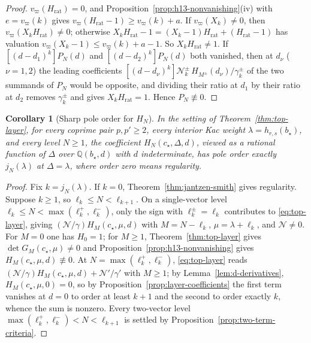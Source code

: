 \documentclass[twoside,10pt]{article}
\numberwithin{equation}{section}
\theoremstyle{slbody}
\newtheorem{corollary}[theorem]{Corollary}
\theoremstyle{definition}
\theoremstyle{remark}
\begin{document}
\begin{proof}
\(v_\varpi(H_{\mathrm{rat}})=0\), and
Proposition~\ref{prop:h13-nonvanishing}(iv) with \(e=v_\varpi(k)\) gives
\(v_\varpi(H_{\mathrm{rat}}-1)\geq v_\varpi(k)+a\).  If \(v_\varpi(X_k)\neq0\), then
\(v_\varpi(X_kH_{\mathrm{rat}})\neq0\); otherwise
\(X_kH_{\mathrm{rat}}-1=(X_k-1)H_{\mathrm{rat}}+(H_{\mathrm{rat}}-1)\) has
valuation \(v_\varpi(X_k-1)\leq v_\varpi(k)+a-1\).  So \(X_kH_{\mathrm{rat}}\neq1\).
If \([(d-d_1)^k]P_N(d)\) and \([(d-d_2)^k]P_N(d)\) both vanished, then at
\(d_\nu\) (\(\nu=1,2\)) the leading coefficients
\([(d-d_\nu)^k]\mathcal N^\pm_k\,H_{M^\pm}(d_\nu)/\gamma^\pm_k\) of the two
summands of \(P_N\) would be opposite, and dividing their ratio at \(d_1\) by
their ratio at \(d_2\) removes \(\gamma^\pm_k\) and gives
\(X_kH_{\mathrm{rat}}=1\).  Hence \(P_N\not\equiv0\).
\end{proof}

\begin{corollary}[Sharp pole order for \(H_N\)]
\label{cor:top-layer-sharp}
In the setting of Theorem~\ref{thm:top-layer}, for every coprime pair
\(p,p'\geq2\), every interior Kac weight \(\lambda=h_{r,s}(b_\star)\), and
every level \(N\geq1\), the coefficient \(H_N(c_\star,\Delta,d)\), viewed as
a rational function of \(\Delta\) over \(\mathbb Q(b_\star,d)\) with \(d\)
indeterminate, has pole order exactly \(j_N(\lambda)\) at \(\Delta=\lambda\),
where order zero means regularity.
\end{corollary}

\begin{proof}
Fix \(k=j_N(\lambda)\).  If \(k=0\), Theorem~\ref{thm:jantzen-smith} gives
regularity.  Suppose \(k\geq1\), so \(\ell_k\leq N<\ell_{k+1}\).  On a single-vector level
\(\ell_k\leq N<\max(\ell^+_k,\ell^-_k)\), only the sign with
\(\ell^\pm_k=\ell_k\) contributes to \eqref{eq:top-layer}, giving
\((\mathcal N/\gamma)H_M(c_\star,\mu,d)\) with \(M=N-\ell_k\),
\(\mu=\lambda+\ell_k\), and \(\mathcal N\neq0\).  For \(M=0\) one has \(H_0=1\);
for \(M\geq1\), Theorem~\ref{thm:top-layer} gives
\(\det G_M(c_\star,\mu)\neq0\) and
Proposition~\ref{prop:h13-nonvanishing} gives \(H_M(c_\star,\mu,d)\not\equiv0\).
At \(N=\max(\ell^+_k,\ell^-_k)\), \eqref{eq:top-layer} reads
\((\mathcal N/\gamma)H_M(c_\star,\mu,d)+\mathcal N'/\gamma'\) with \(M\geq1\); by
Lemma~\ref{lem:d-derivatives}, \(H_M(c_\star,\mu,0)=0\), so by
Proposition~\ref{prop:layer-coefficients} the first term vanishes at \(d=0\) to
order at least \(k+1\) and the second to order exactly \(k\), whence the sum is
nonzero.  Every two-vector level
\(\max(\ell^+_k,\ell^-_k)<N<\ell_{k+1}\) is settled by
Proposition~\ref{prop:two-term-criteria}.
\end{proof}
\end{document}
